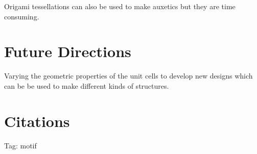 \documentclass{article}
\begin{document}
Origami tessellations can also be used to make auxetics but they are time consuming. 

\section*{Future Directions}
Varying the geometric properties of the unit cells to develop new designs which can be
be used to make different kinds of structures. 



\section*{Citations}


Tag: motif
\cite{motif}
\end{document}
